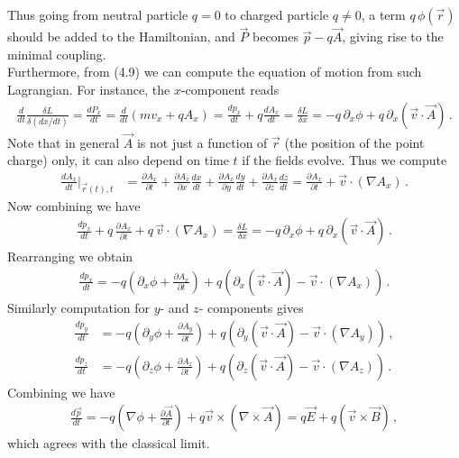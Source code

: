 \documentclass[11pt, onesided]{book}
\theoremstyle{break}
\theoremstyle{break}
\newcommand{\pd}{\partial}
\begin{document}
Thus going from neutral particle $q=0$ to charged particle $q\neq 0$, a term $q\, \phi(\vec{r})$ should be added to the Hamiltonian, and $\vec{P}$ becomes $\vec{p}-q\vec{A}$, giving rise to the minimal coupling. \\

Furthermore, from (4.9) we can compute the equation of motion from such Lagrangian. For instance, the $x$-component reads
\begin{align*}
\frac{d}{dt}\frac{\delta L}{\delta (dx/dt)} =\frac{dP_x}{dt} =\frac{d}{dt}\left( mv_x + qA_x\right) =\frac{dp_x}{dt} + q \frac{dA_x}{dt}= \frac{\delta L}{\delta x}=  -q \, \pd_x \phi + q\, \pd_x(\vec{v}\cdot \vec{A})\,.
\end{align*}
Note that in general $\vec{A}$ is not just a function of $\vec{r}$ (the position of the point charge) only, it can also depend on time $t$ if the fields evolve. Thus we compute
\begin{align*}
\frac{dA_x}{dt}|_{\vec{r}(t), t} 
&= \frac{\pd A_x}{\pd t} + \frac{\pd A_x}{\pd x} \frac{dx}{dt} + \frac{\pd A_x}{\pd y} \frac{dy}{dt}+ \frac{\pd A_x}{\pd z} \frac{dz}{dt}=\frac{\pd A_x}{\pd t} + \vec{v}\cdot (\nabla A_x)\,.
\end{align*}
Now combining we have
\begin{align*}
\frac{dp_x}{dt} + q \, \frac{\pd A_x}{\pd t} + q\,\vec{v}\cdot (\nabla A_x) = \frac{\delta L}{\delta x} = -q \, \pd_x \phi + q\, \pd_x(\vec{v}\cdot \vec{A})\,.
\end{align*}
Rearranging we obtain
\begin{align*}
\frac{dp_x}{dt} = -q\left(\pd_x\phi + \frac{\pd A_x}{\pd t}\right) + q\left( \pd_x (\vec{v}\cdot \vec{A}) - \vec{v}\cdot (\nabla A_x)\right)\,.
\end{align*}
Similarly computation for $y$- and $z$- components gives 
\begin{align*}
\frac{dp_y}{dt} &= -q\left(\pd_y\phi + \frac{\pd A_y}{\pd t}\right) + q\left( \pd_y (\vec{v}\cdot \vec{A}) - \vec{v}\cdot (\nabla A_y)\right)\,,\\
\frac{dp_z}{dt} &= -q\left(\pd_z\phi + \frac{\pd A_z}{\pd t}\right) + q\left( \pd_z (\vec{v}\cdot \vec{A}) - \vec{v}\cdot (\nabla A_z)\right)\,.
\end{align*}
Combining we have
\begin{align*}
\frac{d\vec{p}}{dt} = -q\left(  \nabla \phi + \frac{\pd \vec{A}}{\pd t}\right) + q \vec{v}\times (\nabla \times\vec{A}) =  q\vec{E}  + q (\vec{v}\times \vec{B})\,,
\end{align*}
which agrees with the classical limit.
\end{document}
